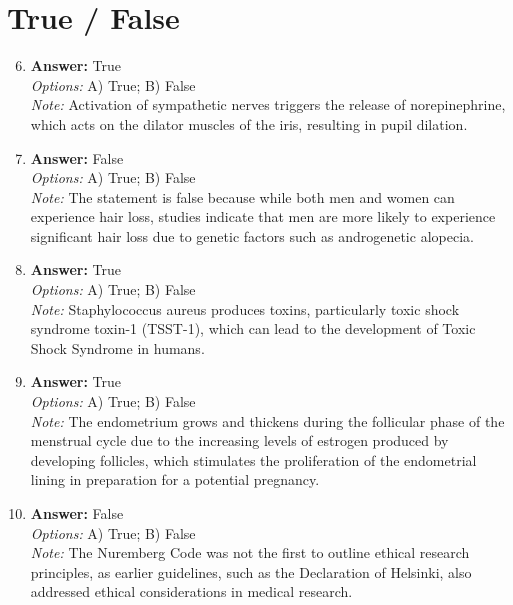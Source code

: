 \documentclass[12pt]{article}
\begin{document}
\section*{True / False}
\begin{enumerate}[label=\arabic*.]
\setcounter{enumi}{5}
\item \textbf{Answer:} True
\\ \textit{Options:} A) True; B) False
\\ \textit{Note:} Activation of sympathetic nerves triggers the release of norepinephrine, which acts on the dilator muscles of the iris, resulting in pupil dilation.
\item \textbf{Answer:} False
\\ \textit{Options:} A) True; B) False
\\ \textit{Note:} The statement is false because while both men and women can experience hair loss, studies indicate that men are more likely to experience significant hair loss due to genetic factors such as androgenetic alopecia.
\item \textbf{Answer:} True
\\ \textit{Options:} A) True; B) False
\\ \textit{Note:} Staphylococcus aureus produces toxins, particularly toxic shock syndrome toxin-1 (TSST-1), which can lead to the development of Toxic Shock Syndrome in humans.
\item \textbf{Answer:} True
\\ \textit{Options:} A) True; B) False
\\ \textit{Note:} The endometrium grows and thickens during the follicular phase of the menstrual cycle due to the increasing levels of estrogen produced by developing follicles, which stimulates the proliferation of the endometrial lining in preparation for a potential pregnancy.
\item \textbf{Answer:} False
\\ \textit{Options:} A) True; B) False
\\ \textit{Note:} The Nuremberg Code was not the first to outline ethical research principles, as earlier guidelines, such as the Declaration of Helsinki, also addressed ethical considerations in medical research.
\end{enumerate}
\end{document}
